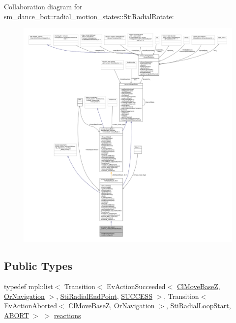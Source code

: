 Collaboration diagram for sm\+\_\+dance\+\_\+bot\+:\+:radial\+\_\+motion\+\_\+states\+:\+:Sti\+Radial\+Rotate\+:
\nopagebreak
\begin{figure}[H]
\begin{center}
\leavevmode
\includegraphics[width=350pt]{structsm__dance__bot_1_1radial__motion__states_1_1StiRadialRotate__coll__graph}
\end{center}
\end{figure}
\subsection*{Public Types}
\begin{DoxyCompactItemize}
\item 
typedef mpl\+::list$<$ Transition$<$ Ev\+Action\+Succeeded$<$ \hyperlink{classmove__base__z__client_1_1ClMoveBaseZ}{Cl\+Move\+BaseZ}, \hyperlink{classsm__dance__bot_1_1OrNavigation}{Or\+Navigation} $>$, \hyperlink{structsm__dance__bot_1_1radial__motion__states_1_1StiRadialEndPoint}{Sti\+Radial\+End\+Point}, \hyperlink{classSUCCESS}{S\+U\+C\+C\+E\+SS} $>$, Transition$<$ Ev\+Action\+Aborted$<$ \hyperlink{classmove__base__z__client_1_1ClMoveBaseZ}{Cl\+Move\+BaseZ}, \hyperlink{classsm__dance__bot_1_1OrNavigation}{Or\+Navigation} $>$, \hyperlink{structsm__dance__bot_1_1radial__motion__states_1_1StiRadialLoopStart}{Sti\+Radial\+Loop\+Start}, \hyperlink{classABORT}{A\+B\+O\+RT} $>$ $>$ \hyperlink{structsm__dance__bot_1_1radial__motion__states_1_1StiRadialRotate_a9a1ffbc6c684c386ecad126451aa45f8}{reactions}
\end{DoxyCompactItemize}
